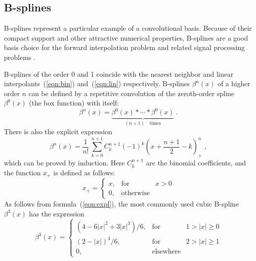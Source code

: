 
\subsection{B-splines}

B-splines represent a particular example of a convolutional basis.
Because of their compact support and other attractive numerical
properties, B-splines are a good basis choice for the forward
interpolation problem and related signal processing problems \cite[]{unser}.
\par
B-splines of the order 0 and 1 coincide with the nearest neighbor and
linear interpolants~(\ref{eqn:bin}) and~(\ref{eqn:lin}) respectively.
B-splines $\beta^n(x)$ of a higher order $n$ can be defined by a
repetitive convolution of the zeroth-order spline $\beta^0(x)$ (the
box function) with itself:
\begin{equation}
\label{eqn:bdef}
\beta^n(x) = 
\underbrace{\beta^0(x) \ast \cdots \ast \beta^0(x)}_{(n+1)\quad 
\mbox{times}}\;.
\end{equation}
There is also the explicit expression
\begin{equation}
\label{eqn:expl}
\beta^n(x) = 
\frac{1}{n!}\,\sum_{k=0}^{n+1} C_k^{n+1} (-1)^k 
(x + \frac{n+1}{2} - k)_{+}^n\;,
\end{equation}
which can be proved by induction. Here $C_k^{n+1}$ are the binomial
coefficients, and the function $x_{+}$ is defined as follows:
\begin{equation}
  \label{eqn:xp}
  x_{+} = \left\{\begin{array}{lcr}
x, & \mbox{for} & x > 0 \\
0, & \mbox{otherwise} &
\end{array}\right.
\end{equation}
As follows from formula~(\ref{eqn:expl}), the most commonly used cubic
B-spline $\beta^3(x)$ has the expression
\begin{equation}
  \label{eqn:beta3}
  \beta^3(x) = \left\{\begin{array}{lcr}
\displaystyle \left(4-6 |x|^2+3 |x|^3\right)/6, & 
\mbox{for} & 1 > |x| \geq 0 \\
\displaystyle (2-|x|)^3/6, & \mbox{for} & 2 > |x| \geq 1 \\
0, & \mbox{elsewhere} &
\end{array}\right.
\end{equation}
